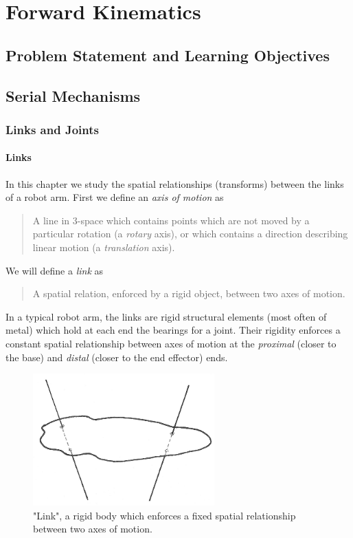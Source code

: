 %

\chapter{Forward Kinematics}





\section{Problem Statement and Learning Objectives}





\section{Serial Mechanisms}

\subsection{Links and Joints}

\subsubsection{Links}
In this chapter we study the spatial relationships (transforms) between the links of a robot arm. First we define an {\it axis of motion} as
\begin{quotation}
A line in 3-space which contains points which are not moved by a particular rotation (a {\it rotary} axis), or which contains a direction describing linear motion (a {\it translation} axis).
\end{quotation}

We will define a {\it link} as
\begin{quotation}
A spatial relation, enforced by a rigid object, between two axes of motion.
\end{quotation}
In a typical robot arm, the links are rigid structural elements (most often of metal) which hold at each end the bearings for a joint.   Their rigidity enforces a constant spatial relationship between axes of motion at the {\it proximal} (closer to the base) and {\it distal} (closer to the end effector) ends.

\begin{figure}\centering
\includegraphics[width=2.75in]{figs03/00718.eps}
\caption{"Link", a rigid body which enforces a fixed spatial relationship between two axes of motion.}\label{LINK}
\end{figure}

